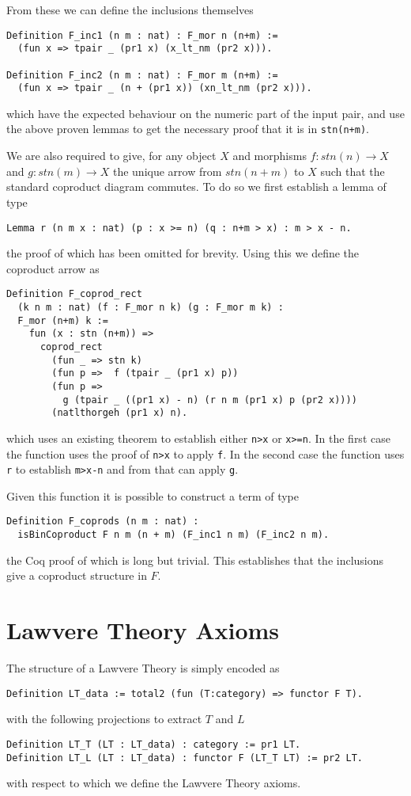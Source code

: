From these we can define the inclusions themselves
\begin{lstlisting}
Definition F_inc1 (n m : nat) : F_mor n (n+m) := 
  (fun x => tpair _ (pr1 x) (x_lt_nm (pr2 x))).

Definition F_inc2 (n m : nat) : F_mor m (n+m) := 
  (fun x => tpair _ (n + (pr1 x)) (xn_lt_nm (pr2 x))).
\end{lstlisting}
which have the expected behaviour on the numeric part of the input pair, and use
the above proven lemmas to get the necessary proof that it is in
\lstinline|stn(n+m)|.

We are also required to give, for any object $X$ and morphisms $f: stn(n)\to X$
and $g: stn(m)\to X$ the unique arrow from $stn(n+m)$ to $X$ such that the
standard coproduct diagram commutes. To do so we first establish a lemma of type
\begin{lstlisting}
Lemma r (n m x : nat) (p : x >= n) (q : n+m > x) : m > x - n.
\end{lstlisting}
the proof of which has been omitted for brevity. Using this we define the
coproduct arrow as
\begin{lstlisting}
Definition F_coprod_rect 
  (k n m : nat) (f : F_mor n k) (g : F_mor m k) : 
  F_mor (n+m) k :=
    fun (x : stn (n+m)) => 
      coprod_rect 
        (fun _ => stn k)
        (fun p =>  f (tpair _ (pr1 x) p))
        (fun p =>  
          g (tpair _ ((pr1 x) - n) (r n m (pr1 x) p (pr2 x))))
        (natlthorgeh (pr1 x) n).
\end{lstlisting}
which uses an existing theorem to establish either \lstinline|n>x| or
\lstinline|x>=n|. In the first case the function uses the proof of
\lstinline|n>x| to apply \lstinline|f|. In the second case the function uses
\lstinline|r| to establish \lstinline|m>x-n| and from that can apply
\lstinline|g|.

Given this function it is possible to construct a term of type
\begin{lstlisting}
Definition F_coprods (n m : nat) : 
  isBinCoproduct F n m (n + m) (F_inc1 n m) (F_inc2 n m).
\end{lstlisting}
the Coq proof of which is long but trivial. This establishes that the inclusions
give a coproduct structure in $F$.

\section{Lawvere Theory Axioms}
The structure of a Lawvere Theory is simply encoded as
\begin{lstlisting}
Definition LT_data := total2 (fun (T:category) => functor F T).
\end{lstlisting}
with the following projections to extract $T$ and $L$
\begin{lstlisting}
Definition LT_T (LT : LT_data) : category := pr1 LT.
Definition LT_L (LT : LT_data) : functor F (LT_T LT) := pr2 LT.
\end{lstlisting}
with respect to which we define the Lawvere Theory axioms.

